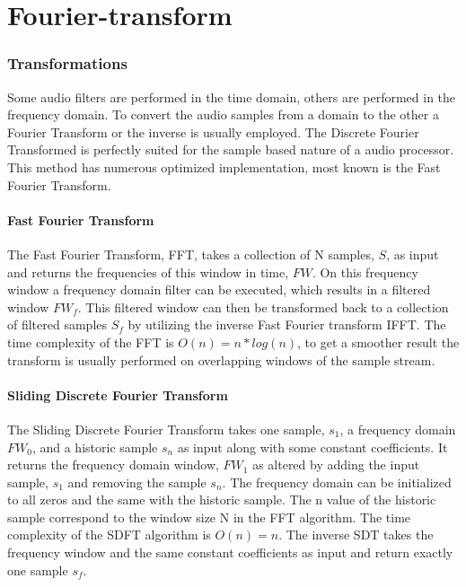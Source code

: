 \chapter{Fourier-transform}
\subsection{Transformations}
Some audio filters are performed in the time domain, others are performed in the
frequency domain.  To convert the audio samples from a domain
to the other a Fourier Transform or the inverse is usually employed. The
Discrete Fourier Transformed  is perfectly suited for the sample based
nature of a audio processor. This method has numerous optimized implementation,
most known is the Fast Fourier Transform.

\subsubsection{Fast Fourier Transform}
The Fast Fourier Transform, FFT, takes a collection of N samples, $S$, as input
and returns the frequencies of this window in time, $FW$. On this frequency
window a frequency domain filter can be executed, which results in a filtered
window $FW_f$. This filtered window can then be transformed back to a collection
of filtered samples $S_f$ by utilizing the inverse Fast Fourier transform IFFT.
The time complexity of the FFT is $O(n) = n*log(n)$, to get a smoother result
the transform is usually performed on overlapping windows of the sample stream.

\subsubsection{Sliding Discrete Fourier Transform}
The Sliding Discrete Fourier Transform takes one sample, $s_1$, a
frequency domain $FW_0$, and a historic sample $s_n$ as input along with some
constant coefficients.
It returns the frequency domain window, $FW_1$ as altered by adding the input
sample, $s_1$ and removing the sample $s_n$. The frequency domain can be
initialized to all zeros and the same with the historic sample. The n value of
the historic sample correspond to the window size N in the FFT algorithm. The
time complexity of the SDFT algorithm is $O(n) = n$. The inverse SDT takes the
frequency window and the same constant coefficients as input and return exactly
one sample $s_f$.

